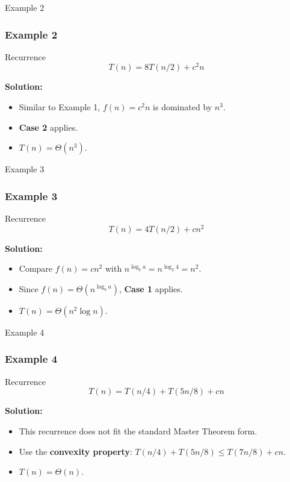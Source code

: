 \documentclass[10pt,aspectratio=43]{beamer}
\begin{document}

\begin{frame}{Example 2}
\frametitle{Example 2}
  \begin{block}{Recurrence}
\[
T(n) = 8T(n/2) + c^2n
\]
  \end{block}

\textbf{Solution:}
\begin{itemize}
    \item Similar to Example 1, \( f(n) = c^2n \) is dominated by \( n^3 \).
    \item \textbf{Case 2} applies.
    \item \( T(n) = \Theta(n^3) \).
\end{itemize}
\end{frame}


\begin{frame}{Example 3}
\frametitle{Example 3}
  \begin{block}{Recurrence}
\[
T(n) = 4T(n/2) + cn^2
\]
  \end{block}
\textbf{Solution:}
\begin{itemize}
    \item Compare \( f(n) = cn^2 \) with \( n^{\log_b a} = n^{\log_2 4} = n^2 \).
    \item Since \( f(n) = \Theta(n^{\log_b a}) \), \textbf{Case 1} applies.
    \item \( T(n) = \Theta(n^2 \log n) \).
\end{itemize}
\end{frame}


\begin{frame}{Example 4}
\frametitle{Example 4}
  \begin{block}{Recurrence}
\[
T(n) = T(n/4) + T(5n/8) + cn
\]
  \end{block}

\textbf{Solution:}
\begin{itemize}
    \item This recurrence does not fit the standard Master Theorem form.
    \item Use the \textbf{convexity property}: \( T(n/4) + T(5n/8) \leq T(7n/8) + cn \).
    \item \( T(n) = \Theta(n) \).
\end{itemize}
\end{frame}
\end{document}
